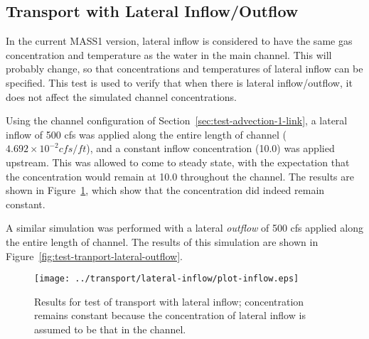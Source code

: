 \documentclass[12pt,dvips,letterpaper]{article}
\begin{document}



\subsection{Transport with Lateral Inflow/Outflow}
\label{sec:test-transport-lateral}

In the current MASS1 version, lateral inflow is considered to have the
same gas concentration and temperature as the water in the main
channel.  This will probably change, so that concentrations and
temperatures of lateral inflow can be specified.  This test is used to
verify that when there is lateral inflow/outflow, it does not affect
the simulated channel concentrations.  

Using the channel configuration of
Section~\ref{sec:test-advection-1-link}, a lateral inflow of 500 cfs
was applied along the entire length of channel ($4.692 \times 10^{-2}
cfs/ft$), and a constant inflow concentration (10.0) was applied
upstream.  This was allowed to come to steady state, with the
expectation that the concentration would remain at 10.0 throughout the
channel.  The results are shown in
Figure~\ref{fig:test-tranport-lateral-inflow}, which show that the
concentration did indeed remain constant. 

A similar simulation was performed with a lateral \textit{outflow} of
500 cfs applied along the entire length of channel.  The results of
this simulation are shown in
Figure~\ref{fig:test-tranport-lateral-outflow}.

\begin{figure}[htbp]
  \begin{center}
    \texttt{[image: ../transport/lateral-inflow/plot-inflow.eps]}
    \caption{Results for test of transport with lateral inflow;
      concentration remains constant because the concentration of
      lateral inflow is assumed to be that in the channel.} 
    \label{fig:test-tranport-lateral-inflow}
  \end{center}
\end{figure}
\end{document}
